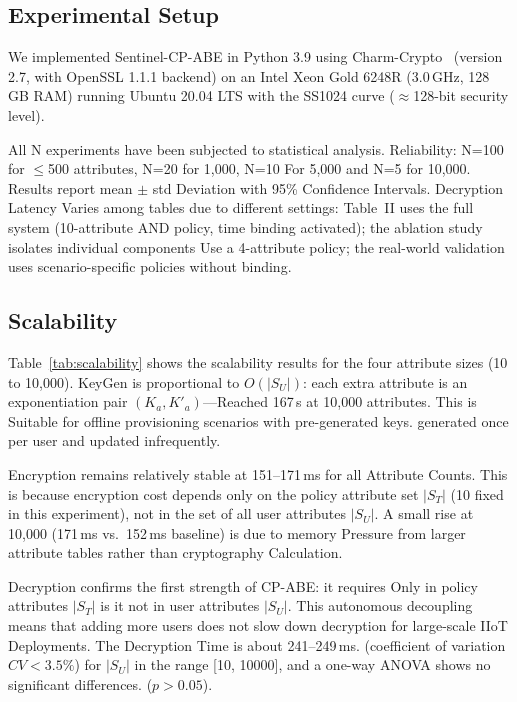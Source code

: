 \documentclass[lettersize,journal]{IEEEtran}
\begin{document}
\subsection{Experimental Setup}
\label{subsec:setup}

We implemented Sentinel-CP-ABE in Python 3.9 using
Charm-Crypto~\cite{Charm2013} (version 2.7, with OpenSSL 1.1.1 backend)
on an Intel Xeon Gold 6248R (3.0\,GHz, 128\,GB RAM) running Ubuntu
20.04 LTS with the SS1024 curve ($\approx$128-bit security level).

All N experiments have been subjected to statistical analysis.
Reliability: N=100 for $\leq$500 attributes, N=20 for 1,000, N=10
For 5,000 and N=5 for 10,000. Results report mean $\pm$ std
Deviation with 95\% Confidence Intervals. Decryption Latency
Varies among tables due to different settings: Table~II
uses the full system (10-attribute AND policy, time binding
activated); the ablation study isolates individual components
Use a 4-attribute policy; the real-world validation uses scenario-specific policies without binding.

\subsection{Scalability}
\label{subsec:scalability}

Table~\ref{tab:scalability} shows the scalability results for the four attribute sizes (10 to 10,000). KeyGen is proportional to
$O(|S_U|)$: each extra attribute is an exponentiation pair
$(K_a, K'_a)$---Reached 167\,s at 10,000 attributes. This is
Suitable for offline provisioning scenarios with pre-generated keys.
generated once per user and updated infrequently.

Encryption remains relatively stable at 151--171\,ms for all
Attribute Counts. This is because encryption cost depends only
on the policy attribute set $|S_T|$ (10 fixed in this experiment),
not in the set of all user attributes $|S_U|$. A small rise
at 10,000 (171\,ms vs.\ 152\,ms baseline) is due to memory
Pressure from larger attribute tables rather than cryptography
Calculation.

Decryption confirms the first strength of CP-ABE: it requires
Only in policy attributes $|S_T|$ is it not in user attributes $|S_U|$.
This autonomous decoupling means that adding more users
does not slow down decryption for large-scale IIoT
Deployments. The Decryption Time is about 241--249\,ms.
(coefficient of variation $CV < 3.5\%$) for $|S_U|$ in the range [10, 10000], and a one-way ANOVA shows no significant differences.
($p > 0.05$).
\end{document}
